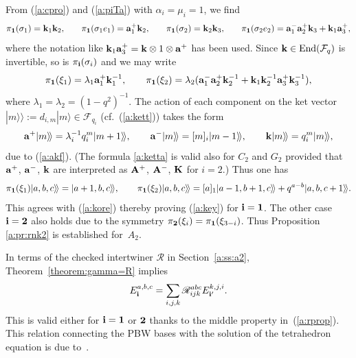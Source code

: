 \documentclass[pdftex]{sigma}
\begin{document}
From (\ref{a:cpro}) and (\ref{a:piTa}) with $\alpha_i=\mu_i=1$, we f\/ind
\begin{gather*}
\pi_{{\bf 1}}(\sigma_1) = {\bf k}_1{\bf k}_2,\qquad\!
\pi_{{\bf 1}}(\sigma_1e_1)
= {\rm{\bf a}}^+_1{\bf k}_2,\qquad\!
\pi_{{\bf 1}}(\sigma_2) ={\bf k}_2{\bf k}_3,\qquad\!
\pi_{{\bf 1}}(\sigma_2e_2) =
{\rm{\bf a}}^-_1{\rm{\bf a}}^+_2{\bf k}_3
+{\bf k}_1{\rm{\bf a}}^+_3,
\end{gather*}
where the notation like
${\bf k}_1{\rm{\bf a}}^+_3 = {\bf k}\otimes 1 \otimes {\rm{\bf a}}^+$
has been used.
Since ${\bf k}\in \mathrm{End}({\mathcal F}_q)$ is invertible,
so is $\pi_{\bf i}(\sigma_i)$ and we may write
\begin{gather*}
\pi_{\bf 1}(\xi_1) = \lambda_1
{\rm{\bf a}}^+_1{\bf k}^{-1}_1,\qquad
\pi_{\bf 1}(\xi_2) = \lambda_2
({\rm{\bf a}}^-_1{\rm{\bf a}}^+_2{\bf k}^{-1}_2
+{\bf k}_1{\bf k}^{-1}_2{\rm{\bf a}}^+_3{\bf k}^{-1}_3),
\end{gather*}
where $\lambda_1=\lambda_2 = (1-q^2)^{-1}$.
The action of each component on the ket vector
$|m\rangle\!\rangle :=d_{i,m}|m\rangle \in {\mathcal F}_{q_i}$
(cf.~(\ref{a:kett})) takes the form
\begin{gather}\label{a:ketta}
{\rm{\bf a}}^+|m\rangle\!\rangle =
\lambda_i^{-1}q_i^m|m+1\rangle\!\rangle,\qquad
{\rm{\bf a}}^-|m\rangle\!\rangle =
[m]_i|m-1\rangle\!\rangle,\qquad
{\bf k}|m\rangle\!\rangle=q_i^m|m\rangle\!\rangle,
\end{gather}
due to (\ref{a:akf}).
(The formula \eqref{a:ketta} is valid also for $C_2$ and $G_2$
provided that ${\rm{\bf a}}^+$, ${\rm{\bf a}}^-$, ${\rm{\bf k}}$
are interpreted as
${\rm{\bf A}}^+$, ${\rm{\bf A}}^-$, ${\rm{\bf K}}$
for $i=2$.)
Thus one has
\begin{gather*}
\pi_{\bf 1}(\xi_1)|a,b,c\rangle\!\rangle =
|a+1,b,c\rangle\!\rangle,
\qquad
\pi_{\bf 1}(\xi_2)|a,b,c\rangle\!\rangle =
[a]_1|a-1,b+1,c\rangle\!\rangle
+q^{a-b}|a,b,c+1\rangle\!\rangle.
\end{gather*}
This agrees with (\ref{a:kore}) thereby
proving (\ref{a:key}) for ${\bf i}={\bf 1}$.
The other case  ${\bf i}={\bf 2}$ also holds due to the
symmetry $\pi_{\bf 2}(\xi_i) = \pi_{\bf 1}(\xi_{3-i})$.
Thus Proposition \ref{a:pr:rnk2} is established for~$A_2$.

In terms of the checked intertwiner $\mathscr{R}$ in Section~\ref{a:ss:a2},
Theorem~\ref{theorem:gamma=R} implies
\begin{gather*}
E^{a,b,c}_{\bf i} = \sum_{i,j,k}
\mathscr{R}^{a b c}_{i j k} E^{k,j,i}_{{\bf i}'}.
\end{gather*}
This is valid either for ${\bf i}={\bf 1}$ or ${\bf 2}$
thanks to the middle property in~(\ref{a:rprop}).
This relation connecting the PBW bases with
the solution of the tetrahedron equation is due to~\cite{S08}.
\end{document}

